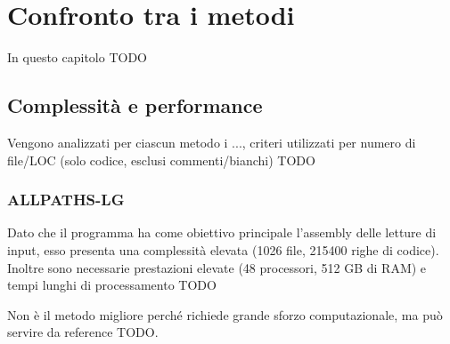 \documentclass[crop=false, class=book]{standalone}
\begin{document}
	
	\chapter{Confronto tra i metodi}
	In questo capitolo TODO
	
	\section{Complessità e performance}
	Vengono analizzati per ciascun metodo i ..., criteri utilizzati per numero di file/LOC (solo codice, esclusi commenti/bianchi) TODO
	
	\subsection{ALLPATHS-LG}
	Dato che il programma ha come obiettivo principale l'assembly delle letture di input, esso presenta una complessità elevata (1026 file, 215400 righe di codice). Inoltre sono necessarie prestazioni elevate (48 processori, 512 GB di RAM) e tempi lunghi di processamento TODO
	
	Non è il metodo migliore perché richiede grande sforzo computazionale, ma può servire da reference TODO.
	
	
		
	
\end{document}
